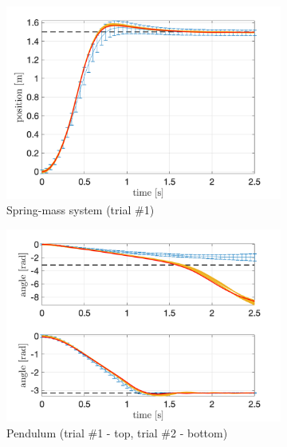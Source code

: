 \documentclass[letterpaper, 10 pt, conference]{ieeeconf}  %
\begin{document}
\begin{figure}[!thp] 
	\centering
	\begin{subfigure}{0.325\textwidth}
	\includegraphics[width=\textwidth]{sdm_quad.png}
	\caption{Spring-mass system (trial \#1)\newline}\label{fig:PILCO_sdm}
	\end{subfigure}
	\begin{subfigure}{0.325\textwidth}
	\includegraphics[width=\textwidth]{pend_quad.png}
	\caption{Pendulum (trial \#1 - top, trial \#2 - bottom)\newline}\label{fig:PILCO_pendulum}
	\end{subfigure}
	\begin{subfigure}{0.325\textwidth}

\end{subfigure}
\end{figure}
\end{document}
